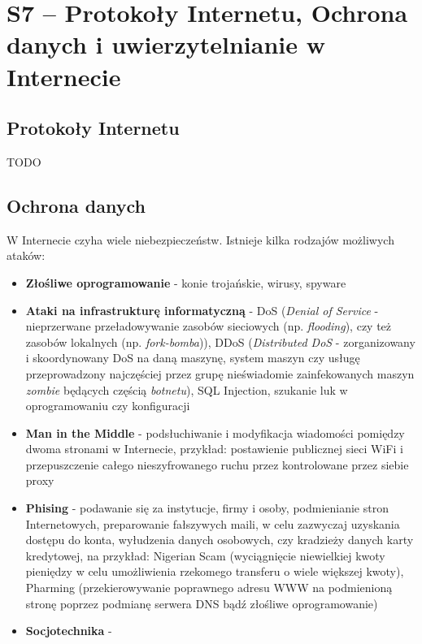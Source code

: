 \section{S7 -- Protokoły Internetu, Ochrona danych i uwierzytelnianie w Internecie}

\subsection{Protokoły Internetu}

TODO

\subsection{Ochrona danych}

W Internecie czyha wiele niebezpieczeństw. Istnieje kilka rodzajów możliwych ataków:
\begin{itemize}
	\item \textbf{Złośliwe oprogramowanie} - konie trojańskie, wirusy, spyware
    \item \textbf{Ataki na infrastrukturę informatyczną} - DoS (\textit{Denial of Service} - nieprzerwane przeładowywanie zasobów sieciowych (np. \textit{flooding}), czy też zasobów lokalnych (np. \textit{fork-bomba})), DDoS (\textit{Distributed DoS} - zorganizowany i skoordynowany DoS na daną maszynę, system maszyn czy usługę przeprowadzony najczęściej przez grupę nieświadomie zainfekowanych maszyn \textit{zombie} będących częścią \textit{botnetu}), SQL Injection, szukanie luk w oprogramowaniu czy konfiguracji
    \item \textbf{Man in the Middle} - podsłuchiwanie i modyfikacja wiadomości pomiędzy dwoma stronami w Internecie, przykład: postawienie publicznej sieci WiFi i przepuszczenie całego nieszyfrowanego ruchu przez kontrolowane przez siebie proxy
    \item \textbf{Phising} - podawanie się za instytucje, firmy i osoby, podmienianie stron Internetowych, preparowanie fałszywych maili, w celu zazwyczaj uzyskania dostępu do konta, wyłudzenia danych osobowych, czy kradzieży danych karty kredytowej, na przykład: Nigerian Scam (wyciągnięcie niewielkiej kwoty pieniędzy w celu umożliwienia rzekomego transferu o wiele większej kwoty), Pharming (przekierowywanie poprawnego adresu WWW na podmienioną stronę poprzez podmianę serwera DNS bądź złośliwe oprogramowanie)
    \item \textbf{Socjotechnika} - 
\end{itemize}

